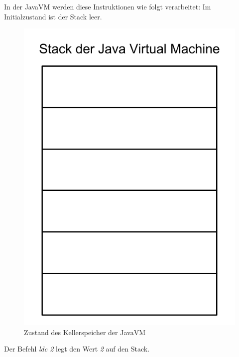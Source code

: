 In der JavaVM werden diese Instruktionen wie folgt verarbeitet:
Im Initialzustand ist der Stack leer.

\begin{figure}[h!]
\centering
\includegraphics[scale=0.2]{pics/stack_visual.png}
\caption{Zustand des Kellerspeicher der JavaVM}
\label{fig:method}
\end{figure}

Der Befehl \textit{ldc 2} legt den Wert \textit{2} auf den Stack.

